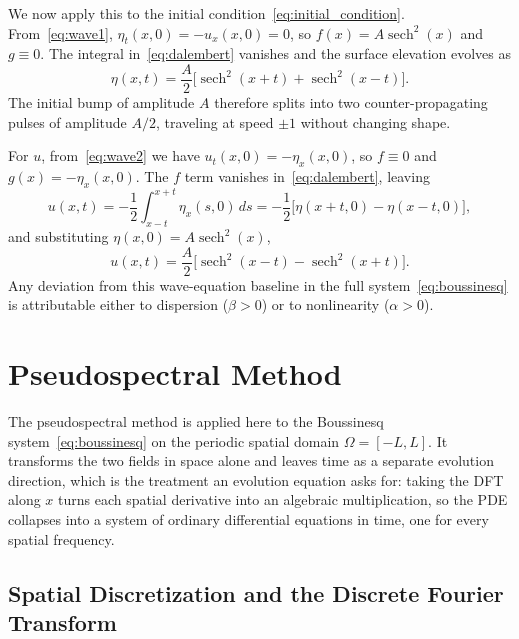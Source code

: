 We now apply this to the initial condition~\eqref{eq:initial_condition}. From~\eqref{eq:wave1}, $\eta_t(x,0) = -u_x(x,0) = 0$, so $f(x) = A\operatorname{sech}^2(x)$ and $g \equiv 0$. The integral in~\eqref{eq:dalembert} vanishes and the surface elevation evolves as
\begin{equation}\label{eq:dalembert_eta}
    \eta(x, t) = \frac{A}{2}\bigl[\operatorname{sech}^2(x+t) + \operatorname{sech}^2(x-t)\bigr].
\end{equation}
The initial bump of amplitude $A$ therefore splits into two counter-propagating pulses of amplitude $A/2$, traveling at speed $\pm 1$ without changing shape.

For $u$, from~\eqref{eq:wave2} we have $u_t(x,0) = -\eta_x(x,0)$, so $f \equiv 0$ and $g(x) = -\eta_x(x,0)$. The $f$ term vanishes in~\eqref{eq:dalembert}, leaving
\begin{equation*}
    u(x,t) = -\frac{1}{2}\int_{x-t}^{x+t} \eta_x(s,0)\,ds
            = -\frac{1}{2}\bigl[\eta(x+t,0) - \eta(x-t,0)\bigr],
\end{equation*}
and substituting $\eta(x,0) = A\operatorname{sech}^2(x)$,
\begin{equation}\label{eq:dalembert_u}
    u(x,t) = \frac{A}{2}\bigl[\operatorname{sech}^2(x-t) - \operatorname{sech}^2(x+t)\bigr].
\end{equation}
Any deviation from this wave-equation baseline in the full system~\eqref{eq:boussinesq} is attributable either to dispersion ($\beta > 0$) or to nonlinearity ($\alpha > 0$).

\section{Pseudospectral Method}
\label{sec:pseudospectral}

The pseudospectral method is applied here to the Boussinesq system~\eqref{eq:boussinesq} on the periodic spatial domain $\Omega = [-L, L]$. It transforms the two fields in space alone and leaves time as a separate evolution direction, which is the treatment an evolution equation asks for: taking the DFT along $x$ turns each spatial derivative into an algebraic multiplication, so the PDE collapses into a system of ordinary differential equations in time, one for every spatial frequency.

\subsection{Spatial Discretization and the Discrete Fourier Transform}
\label{subsec:dft}

